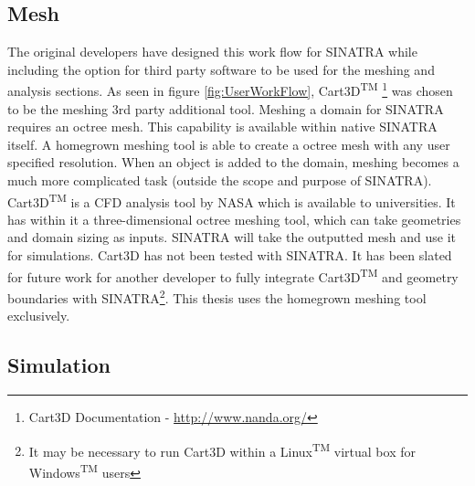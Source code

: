 \subsection{Mesh}
The original developers have designed this work flow for SINATRA while including the option for third party software to be used for the meshing and analysis sections. As seen in figure \ref{fig:UserWorkFlow}, Cart3D\textsuperscript{TM} \footnote{Cart3D Documentation - \url{http://www.nanda.org/}} was chosen to be the meshing 3rd party additional tool. Meshing a domain for SINATRA requires an octree mesh. This capability is available within native SINATRA itself. A homegrown meshing tool is able to create a octree mesh with any user specified resolution. When an object is added to the domain, meshing becomes a much more complicated task (outside the scope and purpose of SINATRA). Cart3D\textsuperscript{TM} is a CFD analysis tool by NASA which is available to universities. It has within it a three-dimensional octree meshing tool, which can take geometries and domain sizing as inputs. SINATRA will take the outputted mesh and use it for simulations. Cart3D has not been tested with SINATRA. It has been slated for future work for another developer to fully integrate Cart3D\textsuperscript{TM} and geometry boundaries with SINATRA\footnote{It may be necessary to run Cart3D within a Linux\textsuperscript{TM} virtual box for Windows\textsuperscript{TM} users}. This thesis uses the homegrown meshing tool exclusively. \par

\subsection{Simulation}


